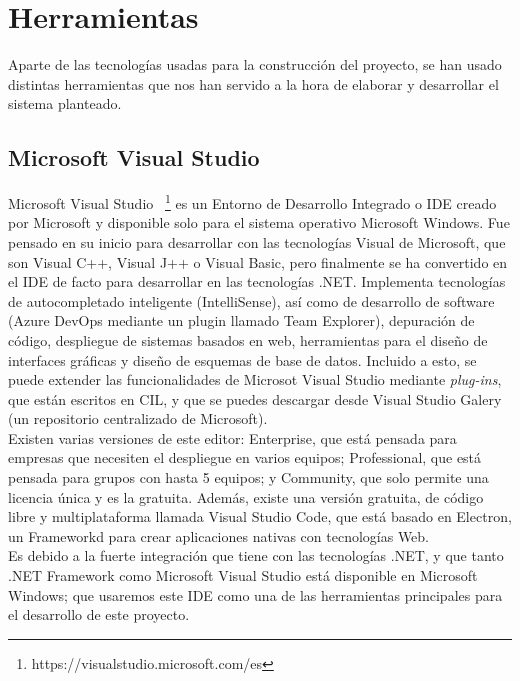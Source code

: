 \section{Herramientas}

Aparte de las tecnologías usadas para la construcción del proyecto, se han usado distintas herramientas que nos han servido a la hora de elaborar y desarrollar el sistema planteado.

\subsection{Microsoft Visual Studio}

Microsoft Visual Studio~ \footnote{https://visualstudio.microsoft.com/es} es un Entorno de Desarrollo Integrado o IDE creado por Microsoft y disponible solo para el sistema operativo Microsoft Windows. Fue pensado en su inicio para desarrollar con las tecnologías Visual de Microsoft, que son Visual C++, Visual J++ o Visual Basic, pero finalmente se ha convertido en el IDE de facto para desarrollar en las tecnologías .NET. Implementa tecnologías de autocompletado inteligente (IntelliSense\texttrademark), así como de desarrollo de software (Azure DevOps mediante un plugin llamado Team Explorer), depuración de código, despliegue de sistemas basados en web, herramientas para el diseño de interfaces gráficas y diseño de esquemas de base de datos. Incluido a esto, se puede extender las funcionalidades de Microsot Visual Studio mediante \textit{plug-ins}, que están escritos en CIL, y que se puedes descargar desde Visual Studio Galery (un repositorio centralizado de Microsoft). \\

Existen varias versiones de este editor: Enterprise, que está pensada para empresas que necesiten el despliegue en varios equipos; Professional, que está pensada para grupos con hasta 5 equipos; y Community, que solo permite una licencia única y es la gratuita. Además, existe una versión gratuita, de código libre y multiplataforma llamada Visual Studio Code, que está basado en Electron, un Frameworkd para crear aplicaciones nativas con tecnologías Web. \\

Es debido a la fuerte integración que tiene con las tecnologías .NET, y que tanto .NET Framework como Microsoft Visual Studio está disponible en Microsoft Windows; que usaremos este IDE como una de las herramientas principales para el desarrollo de este proyecto.

